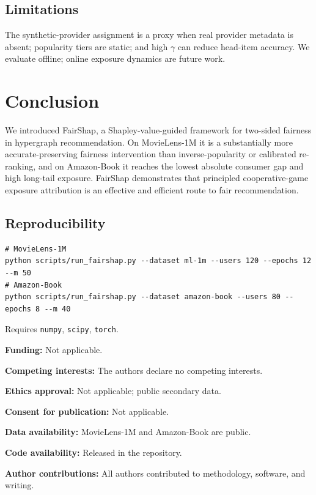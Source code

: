 \documentclass[pdflatex,sn-mathphys-num]{sn-jnl}%
\theoremstyle{thmstyleone}%
\theoremstyle{thmstyletwo}%
\theoremstyle{thmstylethree}%
\begin{document}
\subsection{Limitations}
The synthetic-provider assignment is a proxy when real provider metadata is absent; popularity tiers are static; and high $\gamma$ can reduce head-item accuracy. We evaluate offline; online exposure dynamics are future work.

\section{Conclusion}\label{sec6}

We introduced FairShap, a Shapley-value-guided framework for two-sided fairness in hypergraph recommendation. On MovieLens-1M it is a substantially more accurate-preserving fairness intervention than inverse-popularity or calibrated re-ranking, and on Amazon-Book it reaches the lowest absolute consumer gap and high long-tail exposure. FairShap demonstrates that principled cooperative-game exposure attribution is an effective and efficient route to fair recommendation.

\backmatter

\begin{appendices}

\section{Reproducibility}\label{app:repro}
\begin{verbatim}
# MovieLens-1M
python scripts/run_fairshap.py --dataset ml-1m --users 120 --epochs 12 --m 50
# Amazon-Book
python scripts/run_fairshap.py --dataset amazon-book --users 80 --epochs 8 --m 40
\end{verbatim}
Requires \texttt{numpy}, \texttt{scipy}, \texttt{torch}.

\end{appendices}

\begin{declarations}
\item \textbf{Funding:} Not applicable.
\item \textbf{Competing interests:} The authors declare no competing interests.
\item \textbf{Ethics approval:} Not applicable; public secondary data.
\item \textbf{Consent for publication:} Not applicable.
\item \textbf{Data availability:} MovieLens-1M and Amazon-Book are public.
\item \textbf{Code availability:} Released in the repository.
\item \textbf{Author contributions:} All authors contributed to methodology, software, and writing.
\end{declarations}

%
\end{document}
